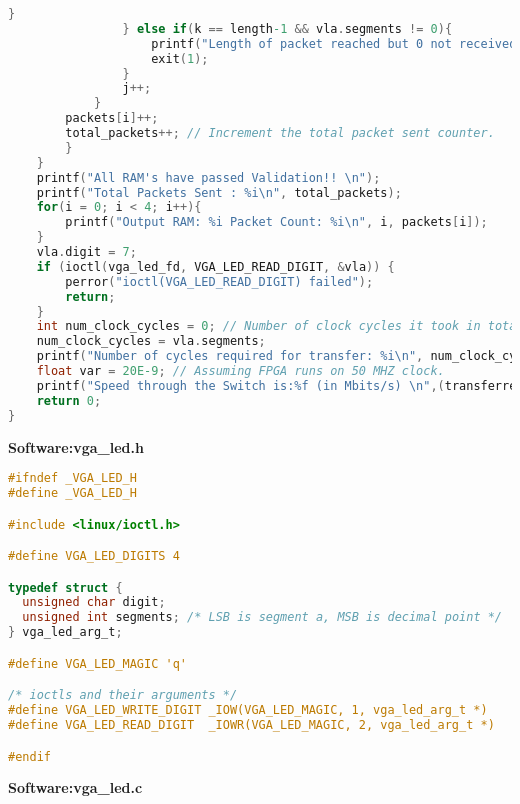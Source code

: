 \documentclass[twoside,12pt,fleqn]{book} %
\begin{document}
\begin{lstlisting}[language=C]
                    }
                } else if(k == length-1 && vla.segments != 0){
                    printf("Length of packet reached but 0 not received.\n");
                    exit(1);
                }
                j++;                
            }
        packets[i]++;
        total_packets++; // Increment the total packet sent counter.
        }
    }
    printf("All RAM's have passed Validation!! \n");
    printf("Total Packets Sent : %i\n", total_packets);
    for(i = 0; i < 4; i++){
        printf("Output RAM: %i Packet Count: %i\n", i, packets[i]);
    }
    vla.digit = 7;
    if (ioctl(vga_led_fd, VGA_LED_READ_DIGIT, &vla)) {
        perror("ioctl(VGA_LED_READ_DIGIT) failed");
        return;
    }
    int num_clock_cycles = 0; // Number of clock cycles it took in total
    num_clock_cycles = vla.segments;
    printf("Number of cycles required for transfer: %i\n", num_clock_cycles);
    float var = 20E-9; // Assuming FPGA runs on 50 MHZ clock.
    printf("Speed through the Switch is:%f (in Mbits/s) \n",(transferred_data*4*8)/(var*1024*1024*num_clock_cycles));
    return 0;
}

\end{lstlisting}
\newpage
\textbf{Software:vga\_led.h}
\begin{lstlisting}[language=C]
#ifndef _VGA_LED_H
#define _VGA_LED_H

#include <linux/ioctl.h>

#define VGA_LED_DIGITS 4

typedef struct {
  unsigned char digit;
  unsigned int segments; /* LSB is segment a, MSB is decimal point */
} vga_led_arg_t;

#define VGA_LED_MAGIC 'q'

/* ioctls and their arguments */
#define VGA_LED_WRITE_DIGIT _IOW(VGA_LED_MAGIC, 1, vga_led_arg_t *)
#define VGA_LED_READ_DIGIT  _IOWR(VGA_LED_MAGIC, 2, vga_led_arg_t *)

#endif
\end{lstlisting}
\newpage 
\textbf{Software:vga\_led.c}
\end{document}
